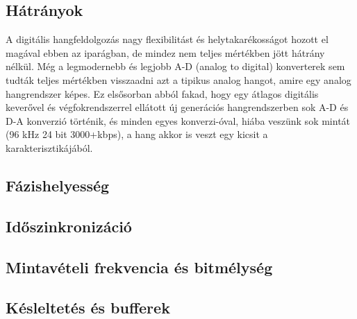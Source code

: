 \subsection{Hátrányok}

A digitális hangfeldolgozás nagy flexibilitást és helytakarékosságot hozott el
magával ebben az iparágban, de mindez nem teljes mértékben jött hátrány nélkül.
Még a legmodernebb és legjobb A-D (analog to digital) konverterek sem tudták
teljes mértékben visszaadni azt a tipikus analog hangot, amire egy analog
hangrendszer képes. Ez elsősorban abból fakad, hogy egy átlagos digitális
keverővel és végfokrendszerrel ellátott új generációs hangrendszerben sok A-D és
D-A konverzió történik, és minden egyes konverzi-óval, hiába veszünk sok mintát
(96 kHz 24 bit 3000+kbps), a hang akkor is veszt egy kicsit a
karakterisztikájából.


\subsection{Fázishelyesség}


\subsection{Időszinkronizáció}


\subsection{Mintavételi frekvencia és bitmélység}

\subsection{Késleltetés és bufferek}

